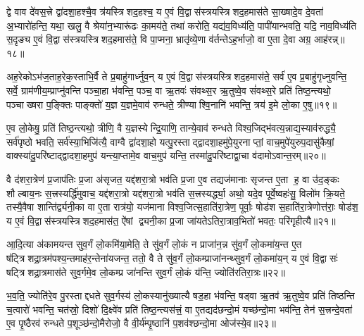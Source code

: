द्वे वाव दे॑वस॒त्त्रे द्वा॑दशा॒हश्चै॒व त्र॑यस्त्रिशद॒हश्च॒ य ए॒वं वि॒द्वास॑स्त्रयस्त्रिशद॒हमास॑ते सा॒ख्षादे॒व दे॒वता॑ अ॒भ्यारो॑हन्ति॒ यथा॒ खलु॒ वै श्रेया॑न॒भ्यारू॑ढः का॒मय॑ते॒ तथा॑ करोति॒ यद्य॑व॒विध्य॑ति॒ पापी॑यान्भवति॒ यदि॒ नाव॒विध्य॑ति स॒दृङ्य ए॒वं वि॒द्वास॑स्त्रयस्त्रिशद॒हमास॑ते॒ वि पा॒प्मना॒ भ्रातृ॑व्ये॒णा व॑र्तन्तेऽह॒र्भाजो॒ वा ए॒ता दे॒वा अग्र॒ आह॑रन्न्॥१८॥

अह॒रेकोऽभ॑ज॒ताह॒रेक॒स्ताभि॒र्वै ते प्र॒बाहु॑गार्ध्नुव॒न् य ए॒वं वि॒द्वास॑स्त्रयस्त्रिशद॒हमास॑ते॒ सर्व॑ ए॒व प्र॒बाहु॑गृध्नुवन्ति॒ सर्वे॒ ग्राम॑णीय॒म्प्राप्नु॑वन्ति पञ्चा॒हा भ॑वन्ति॒ पञ्च॒ वा ऋ॒तवः॑ संवथ्स॒र ऋ॒तुष्वे॒व सं॑वथ्स॒रे प्रति॑ तिष्ठ॒न्त्यथो॒ पञ्चाख्षरा प॒ङ्क्तिः पाङ्क्तो॑ य॒ज्ञ य॒ज्ञमे॒वाव॑ रुन्धते॒ त्रीण्याश्वि॒नानि॑ भवन्ति॒ त्रय॑ इ॒मे लो॒का ए॒षु॥१९॥

ए॒व लो॒केषु॒ प्रति॑ तिष्ठ॒न्त्यथो॒ त्रीणि॒ वै य॒ज्ञस्येन्द्रि॒याणि॒ तान्ये॒वाव॑ रुन्धते विश्व॒जिद्भ॑वत्य॒न्नाद्य॒स्याव॑रुद्ध्यै॒ सर्व॑पृष्ठो भवति॒ सर्व॑स्या॒भिजि॑त्यै॒ वाग्वै द्वा॑दशा॒हो यत्पु॒रस्ताद्द्वादशा॒हमु॑पे॒युरनाप्तां॒ वाच॒मुपे॑युरुप॒दासु॑कैषां॒ वाक्स्या॑दु॒परि॑ष्टाद्द्वादशा॒हमुप॑ यन्त्या॒प्तामे॒व वाच॒मुप॑ यन्ति॒ तस्मा॑दु॒परि॑ष्टाद्वा॒चा व॑दामोऽवान्त॒रम्॥२०॥

वै द॑शरा॒त्रेण॑ प्र॒जाप॑तिः प्र॒जा अ॑सृजत॒ यद्द॑शरा॒त्रो भव॑ति प्र॒जा ए॒व तद्यज॑मानाः सृजन्त ए॒ता ह॒ वा उ॑द॒ङ्कः शौल्बाय॒नः स॒त्त्रस्यर्द्धि॑मुवाच॒ यद्द॑शरा॒त्रो यद्द॑शरा॒त्रो भव॑ति स॒त्त्रस्यर्द्ध्या॒ अथो॒ यदे॒व पूर्वे॒ष्वहः॑सु॒ विलो॑म क्रि॒यते॒ तस्यै॒वैषा शान्ति॑र्द्व्यनी॒का वा ए॒ता रात्र॑यो॒ यज॑माना विश्व॒जित्स॒हाति॑रा॒त्रेण॒ पूर्वाः॒ षोड॑श स॒हाति॑रा॒त्रेणोत्त॑राः॒ षोड॑श॒ य ए॒वं वि॒द्वास॑स्त्रयस्त्रिशद॒हमास॑त॒ ऐ॑षां द्व्यनी॒का प्र॒जा जा॑यतेऽतिरा॒त्राव॒भितो॑ भवतः॒ परि॑गृहीत्यै॥२१॥

{\anuvakamend[{अ॒ह॒र॒न्ने॒ष्व॑वान्त॒र षोड॑श स॒ह स॒प्तद॑श च॥५॥}]}

आ॒दि॒त्या अ॑कामयन्त सुव॒र्गं लो॒कमि॑या॒मेति॒ ते सु॑व॒र्गं लो॒कं न प्राजा॑न॒न्न सु॑व॒र्गं लो॒कमा॑य॒न्त ए॒त ष॑ट्त्रिशद्रा॒त्रम॑पश्य॒न्तमाह॑र॒न्तेना॑यजन्त॒ ततो॒ वै ते सु॑व॒र्गं लो॒कम्प्राजा॑नन्थ्सुव॒र्गं लो॒कमा॑य॒न् य ए॒वं वि॒द्वासः॑ षट्त्रिशद्रा॒त्रमास॑ते सुव॒र्गमे॒व लो॒कम्प्र जा॑नन्ति सुव॒र्गं लो॒कं य॑न्ति॒ ज्योति॑रतिरा॒त्रः॥२२॥

भ॒व॒ति॒ ज्योति॑रे॒व पु॒रस्ताद्दधते सुव॒र्गस्य॑ लो॒कस्यानु॑ख्यात्यै षड॒हा भ॑वन्ति॒ षड्वा ऋ॒तव॑ ऋ॒तुष्वे॒व प्रति॑ तिष्ठन्ति च॒त्वारो॑ भवन्ति॒ चत॑स्रो॒ दिशो॑ दि॒क्ष्वे॑व प्रति॑ तिष्ठ॒न्त्यस॑त्त्रं॒ वा ए॒तद्यद॑छन्दो॒मं यच्छ॑न्दो॒मा भव॑न्ति॒ तेन॑ स॒त्त्रन्दे॒वता॑ ए॒व पृ॒ष्ठैरव॑ रुन्धते प॒शूञ्छ॑न्दो॒मैरोजो॒ वै वी॒र्य॑म्पृ॒ष्ठानि॑ प॒शव॑श्छन्दो॒मा ओज॑स्ये॒व॥२३॥

